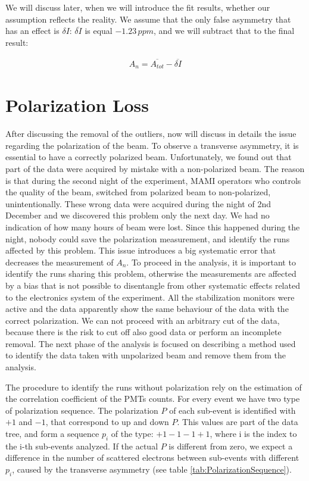 We will discuss later, when we will introduce the fit results, whether our assumption reflects the reality. We assume that the only false asymmetry that has an effect is $\delta I$: $\overline{\delta I}$ is equal $-1.23 \, ppm$, and we will subtract that to the final result:

\begin{align*}
A_{n} = \overline{A_{tot}} - \overline{\delta I}
\end{align*}

\newpage
\newpage
\section{Polarization Loss}

After discussing the removal of the outliers, now will discuss in details the issue regarding the polarization of the beam. To observe a transverse asymmetry, it is essential to have a correctly polarized beam. Unfortunately, we found out that  part of the data were acquired by mistake with a non-polarized beam. The reason is that during the second night of the experiment, MAMI operators who controls the quality of the beam, switched from polarized beam to non-polarized, unintentionally. These wrong data were acquired during the night of 2nd December and we discovered this problem only the next day. We had no indication of how many hours of beam were lost. Since this happened during the night, nobody could save the polarization measurement, and identify the runs affected by this problem.
This issue introduces a big systematic error that decreases the measurement of $A_{n}$. To proceed in the analysis, it is important to identify the runs sharing this problem, otherwise the measurements are affected by a bias that is not possible to disentangle from other systematic effects related to the electronics system of the experiment. 
All the stabilization monitors were active and the data apparently show the same behaviour of the data with the correct polarization. We can not proceed with an arbitrary cut of the data, because there is the risk to cut off also good data or perform an incomplete removal. The next phase of the analysis is focused on describing a method used to identify the data taken with unpolarized beam and remove them from the analysis.
 
The procedure to identify the runs without polarization rely on the estimation of the correlation coefficient of the PMTs counts. For every event we have two type of polarization sequence. The polarization $P$ of each sub-event is identified with $+1$ and $-1$, that correspond to up and down $P$. This values are part of the data tree, and form a sequence $p_{i}$ of the type: $+1-1-1+1$, where i is the index to the i-th sub-events analyzed. If the actual $P$ is different from zero, we expect a difference in the number of scattered electrons between sub-events with different $p_{i}$, caused by the transverse asymmetry (see table \ref{tab:PolarizationSequence}).

